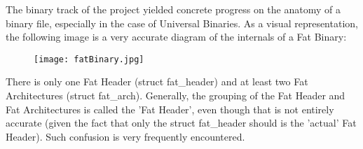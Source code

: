 
The binary track of the project yielded concrete progress on the anatomy of a
binary file, especially in the case of Universal Binaries. As a visual
representation, the following image is a very accurate diagram of the
internals of a Fat Binary:

\begin{figure}[H]
  \texttt{[image: fatBinary.jpg]}
  \centering
\end{figure}

There is only one Fat Header (struct fat_header) and at least two Fat
Architectures (struct fat_arch). Generally, the grouping of the Fat Header and
Fat Architectures is called the 'Fat Header', even though that is not entirely
accurate (given the fact that only the struct fat_header should is the
'actual' Fat Header). Such confusion is very frequently encountered.
